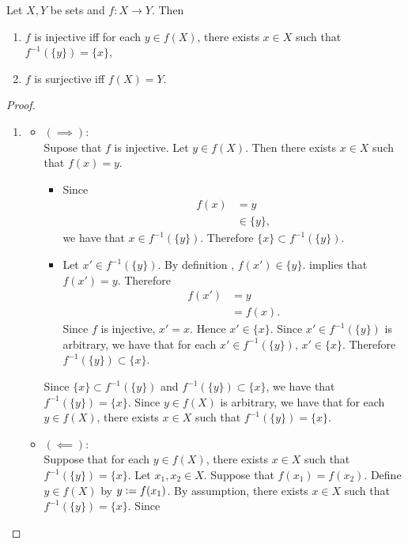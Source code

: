 \documentclass{book}
\begin{document}
	\begin{ex}
		Let $X,Y$ be sets and $f:X \rightarrow Y$. Then 
		\begin{enumerate}
			\item $f$ is injective iff for each $y \in f(X)$, there exists $x \in X$ such that $f^{-1}(\{y\}) = \{x\}$,
			\item $f$ is surjective iff $f(X) = Y$.
		\end{enumerate}
	\end{ex}
	
	\begin{proof}\
		\begin{enumerate}
			\item 
			\begin{itemize}
				\item $(\implies)$: \\
				Supose that $f$ is injective. Let $y \in f(X)$. Then there exists $x \in X$ such that $f(x) = y$. 
				\begin{itemize}
					\item Since 
					\begin{align*}
						f(x)
						& = y \\
						& \in \{y\},
					\end{align*}
					we have that $x \in f^{-1}(\{y\})$. Therefore $\{x\} \subset f^{-1}(\{y\})$. 
					\item Let $x' \in f^{-1}(\{y\})$. By definition \tcr{(ref def)}, $f(x') \in \{y\}$. \rex{}  implies that $f(x') = y$. Therefore
					\begin{align*}
						f(x')
						& = y \\
						& = f(x).
					\end{align*}
					Since $f$ is injective, $x' = x$. Hence $x' \in \{x\}$. Since $x' \in f^{-1}(\{y\})$ is arbitrary, we have that for each $x' \in f^{-1}(\{y\})$, $x' \in \{x\}$. Therefore $f^{-1}(\{y\}) \subset \{x\}$. 
				\end{itemize}
				Since $\{x\} \subset f^{-1}(\{y\})$ and $f^{-1}(\{y\}) \subset \{x\}$, we have that $f^{-1}(\{y\}) = \{x\}$. Since $y \in f(X)$ is arbitrary, we have that for each $y \in f(X)$, there exists $x \in X$ such that $f^{-1}(\{y\}) = \{x\}$. 
				\item $(\impliedby)$: \\
				Suppose that for each $y \in f(X)$, there exists $x \in X$ such that $f^{-1}(\{y\}) = \{x\}$. Let $x_1, x_2 \in X$. Suppose that $f(x_1) = f(x_2)$. Define $y \in f(X)$ by $y \vcentcolon= f(x_1)$. By assumption, there exists $x \in X$ such that $f^{-1}(\{y\}) = \{x\}$. Since 

\end{itemize}
\end{enumerate}
\end{proof}
\end{document}
